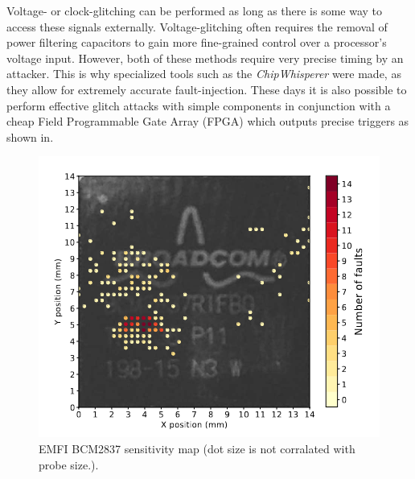 Voltage- or clock-glitching can be performed as long as there is some way to access these signals externally. Voltage-glitching often requires the removal of power filtering capacitors to gain more fine-grained control over a processor's voltage input. However, both of these methods require very precise timing by an attacker. This is why specialized tools such as the \textit{ChipWhisperer}\cite{chipWhisperer} were made, as they allow for extremely accurate fault-injection. These days it is also possible to perform effective glitch attacks with simple components in conjunction with a cheap Field Programmable Gate Array (FPGA) which outputs precise triggers as shown in\cite{hole_in_soc}. 

\begin{figure}[h!]
    \centering
    \includegraphics[scale=0.5]{docs/images/emfi_error_map.png}
    \caption{EMFI BCM2837 sensitivity map (dot size is not corralated with probe size.)\cite{emfi_injection}.}
    \label{fig:emfi_map}
\end{figure}

